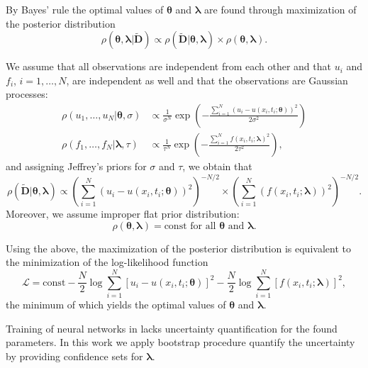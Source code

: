 \documentclass[a4paper, 12pt, english, parskip]{scrartcl}
\newcommand{\DataExt}{\widetilde{\vec{D}}}
\renewcommand{\vec}[1]{\boldsymbol{#1}}
\newcommand{\VTheta}{\ensuremath{\vec{\theta}}}
\newcommand{\VLambda}{\ensuremath{\vec{\lambda}}}
\begin{document}
By Bayes' rule the optimal values of $\vec{\theta}$ and $\vec{\lambda}$
are found through maximization of the posterior distribution
\begin{equation}
    \rho( \VTheta, \VLambda | \DataExt ) \propto
    \rho( \DataExt | \VTheta, \VLambda ) \times
    \rho( \VTheta, \VLambda ).
\end{equation}

We assume that all observations are independent from each other and that $u_i$
and $f_i$, $i=1,\dots,N$, are independent as well and that the observations
are Gaussian processes:
\begin{align}
    \rho(u_1,\dots,u_N | \VTheta, \sigma) &\propto \frac{1}{\sigma^N}
    \exp \left(
        -\frac{\sum_{i=1}^N\left(u_i-u(x_i,t_i; \VTheta)\right)^2}{2\sigma^2}
    \right) \\
    \rho(f_1,\dots,f_N | \vec{\lambda}, \tau) &\propto \frac{1}{\tau^N}
    \exp \left(
        - \frac{\sum_{i=1}^N f(x_i, t_i; \VLambda)^2}{2\tau^2}
    \right),
\end{align}
and assigning Jeffrey's priors for $\sigma$ and $\tau$, we obtain that
\begin{equation}
    \rho(\tilde{\vec{D}} | \VTheta, \VLambda) \propto
    \left( \sum_{i=1}^N (u_i - u(x_i, t_i; \VTheta))^2 \right)^{-N/2} \times
    \left( \sum_{i=1}^N (f(x_i, t_i; \VLambda))^2 \right)^{-N/2}.
\end{equation}
Moreover, we assume improper flat prior distribution:
\begin{equation}
    \rho(\vec{\theta}, \vec{\lambda}) = \text{const} \text{ for all }
    \vec{\theta} \text{ and } \vec{\lambda}.
\end{equation}

Using the above, the maximization of the posterior distribution is equivalent to
the minimization of the log-likelihood function
\begin{equation}
    \mathcal L = \text{const}
    -\frac{N}{2} \log \sum_{i=1}^{N} \left[u_i - u(x_i, t_i; \VTheta)\right]^2 
    -\frac{N}{2} \log \sum_{i=1}^{N} \left[f(x_i, t_i; \VLambda)\right]^2,
\end{equation}
the minimum of which yields the optimal values of $\VTheta$ and
$\VLambda$.

Training of neural networks in \cite{raissi2017pinnII} lacks uncertainty
quantification for the found parameters. In this work we apply bootstrap
procedure \cite{Wasserman2004} quantify the uncertainty by providing confidence
sets for $\VLambda$.
\end{document}
